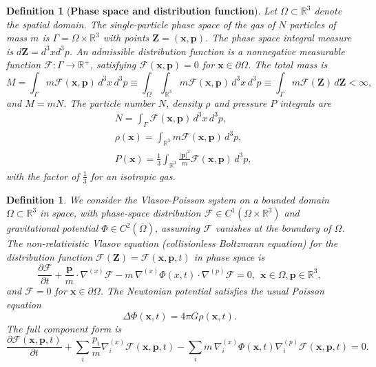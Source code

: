 \documentclass[12pt,a4paper]{article}
\newtheorem{defn}[thm]{Definition}
\numberwithin{equation}{section}
\begin{document}
\begin{defn}[\textbf{Phase space and distribution function}]
Let $\Omega\subset\mathbb{R}^3$ denote the spatial domain. The single-particle phase space of the gas of $N$ particles of mass $m$ is $\Gamma = \Omega \times \mathbb{R}^3 $ with points $\mathbf{Z}=(\mathbf{x},\mathbf{p})$. The phase space integral measure is $d\mathbf{Z}=d^{3}xd^{3}p$. An admissible distribution function is a nonnegative measurable function $\mathcal{F} : \Gamma \to \mathbb{R}^+ $,
satisfying $\mathcal{F}(\mathbf{x},\mathbf{p})=0$ for $\mathbf{x}\in\partial\Omega$. The total mass  is
\begin{equation}
M = \int_{\Gamma} m \mathcal{F}(\mathbf{x},\mathbf{p}) \, d^3x\, d^3p \equiv \int_{\Omega}\int_{\mathbb{R}^{3}} m \mathcal{F}(\mathbf{x},\mathbf{p}) \, d^3x\, d^3p\equiv
\int_{\Gamma}m \mathcal{F}(\mathbf{Z})\,d\mathbf{Z}< \infty,
\end{equation}
and $M=mN$. The particle number $N$, density $\rho$ and pressure $P$ integrals are
\begin{align}
&N=\int_{\Gamma}\mathcal{F}(\mathbf{x},\mathbf{p})\,d^{3}x\,d^{3}p,\\
&\rho(\mathbf{x})=\int_{\mathbb{R}^{3}}m \mathcal{F}(\mathbf{x},\mathbf{p})\,d^{3}p,\\
&P(\mathbf{x})=\frac{1}{3}\int_{\mathbb{R}^{3}}\frac{|\mathbf{p}|^{2}}{m} \mathcal{F}(\mathbf{x},\mathbf{p})\,d^{3}p,
\end{align}
with the factor of $\tfrac{1}{3}$ for an isotropic gas.
\end{defn}

\begin{defn}
We consider the Vlasov-Poisson system on a bounded domain $\Omega \subset \mathbb{R}^3$ in space, with phase-space distribution $\mathcal{F} \in C^1(\Omega \times \mathbb{R}^3)$ and gravitational potential $\Phi \in C^2(\overline{\Omega})$, assuming $\mathcal{F}$ vanishes at the boundary of $\Omega$. The \emph{non-relativistic Vlasov equation} (collisionless Boltzmann equation) for the distribution function $ \mathcal{F}(\mathbf{Z})=\mathcal{F}(\mathbf{x},\bm{p}, t) $ in phase space is
\begin{equation}
\frac{\partial \mathcal{F}}{\partial t} + \frac{\bm{p}}{m} \cdot \nabla^{(x)} \mathcal{F} - m \, \nabla^{(x)} \Phi({x},t) \cdot \nabla^{(p)} \mathcal{F} = 0,~~\mathbf{x}\in\Omega,\mathbf{p}\in\mathbb{R}^{3},
\end{equation}
and $\mathcal{F}=0$ for $\mathbf{x}\in\partial\Omega$. The Newtonian potential satisfies the usual Poisson equation
\begin{equation}
\Delta \Phi(\mathbf{x},t) = 4 \pi G \rho(\mathbf{x},t).
\end{equation}
The full component form is
\begin{equation}
\frac{\partial \mathcal{F}(\mathbf{x},\mathbf{p},t)}{\partial t}+\sum_i \frac{p_i}{m}\nabla_i^{(x)} \mathcal{F}(\mathbf{x},\mathbf{p},t) - \sum_i m \, \nabla_i^{(x)}\Phi(\mathbf{x},t)\nabla_i^{(p)}\mathcal{F}(\mathbf{x},\mathbf{p},t) = 0.
\end{equation}
\end{defn}
\end{document}
